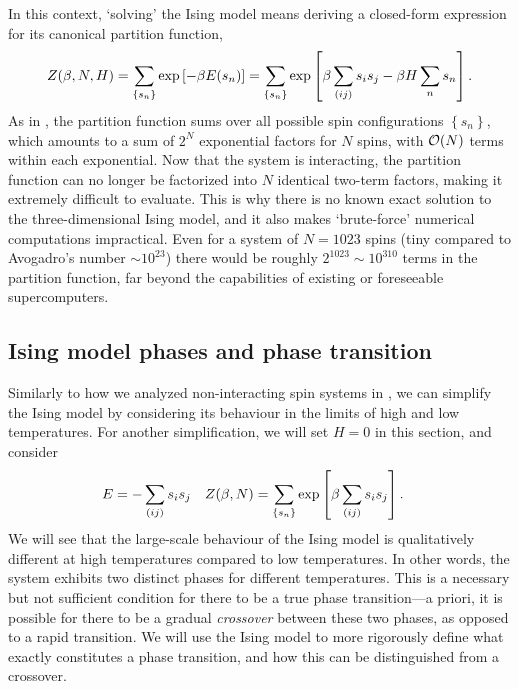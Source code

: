 In this context, `solving' the Ising model means deriving a closed-form expression for its canonical partition function,
\begin{equation*}
  Z(\beta, N, H) = \sum_{\left\{s_n\right\}} \exp\left[-\beta E(s_n)\right] = \sum_{\left\{s_n\right\}} \exp\left[\beta\sum_{(ij)} s_i s_j - \beta H \sum_n s_n\right].
\end{equation*}
As in , the partition function sums over all possible spin configurations $\left\{s_n\right\}$, which amounts to a sum of $2^N$ exponential factors for $N$ spins, with $\mathcal O(N)$ terms within each exponential.
Now that the system is interacting, the partition function can no longer be factorized into $N$ identical two-term factors, making it extremely difficult to evaluate.
This is why there is no known exact solution to the three-dimensional Ising model, and it also makes `brute-force' numerical computations impractical.
Even for a system of $N = 1023$ spins (tiny compared to Avogadro's number $\sim 10^{23}$) there would be roughly $2^{1023} \sim 10^{310}$ terms in the partition function, far beyond the capabilities of existing or foreseeable supercomputers.



\subsection{Ising model phases and phase transition}
Similarly to how we analyzed non-interacting spin systems in , we can simplify the Ising model by considering its behaviour in the limits of high and low temperatures.
For another simplification, we will set $H = 0$ in this section, and consider
\begin{align}
  \label{eq:Ising_zero_field}
  E & = -\sum_{(ij)} s_i s_j &
  Z(\beta, N) & = \sum_{\left\{s_n\right\}} \exp\left[\beta\sum_{(ij)} s_i s_j\right].
\end{align}
We will see that the large-scale behaviour of the Ising model is qualitatively different at high temperatures compared to low temperatures.
In other words, the system exhibits two distinct phases for different temperatures.
This is a necessary but not sufficient condition for there to be a true phase transition---a priori, it is possible for there to be a gradual \textit{crossover} between these two phases, as opposed to a rapid transition.
We will use the Ising model to more rigorously define what exactly constitutes a phase transition, and how this can be distinguished from a crossover.

